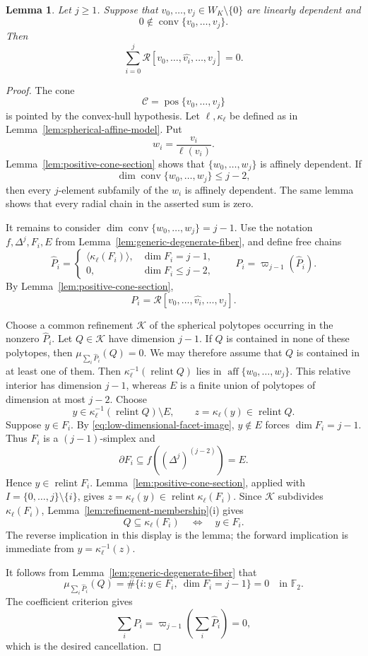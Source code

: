 \documentclass[reqno,12pt]{amsart}
\newtheorem{lemma}[theorem]{Lemma}
\theoremstyle{definition}
\DeclareMathOperator{\conv}{conv}
\DeclareMathOperator{\pos}{pos}
\DeclareMathOperator{\relint}{relint}
\newcommand{\F}{\mathbb F_2}
\begin{document}
\begin{lemma}
\label{lem:degenerate-radial-cancellation}
Let \(j\geq1\).  Suppose that
\(v_0,\ldots,v_j\in W_K\setminus\{0\}\) are linearly dependent and
\[
 0\notin\conv\{v_0,\ldots,v_j\}.
\]
Then
\[
 \sum_{i=0}^j
 \mathcal R[v_0,\ldots,\widehat{v_i},\ldots,v_j]=0.
\]
\end{lemma}

\begin{proof}
The cone
\[
 \mathcal C=\pos\{v_0,\ldots,v_j\}
\]
is pointed by the convex-hull hypothesis.  Let
\(\ell,\kappa_\ell\) be defined as in
Lemma~\ref{lem:spherical-affine-model}.  Put
\[
 w_i=\frac{v_i}{\ell(v_i)}.
\]
Lemma~\ref{lem:positive-cone-section} shows that
\(\{w_0,\ldots,w_j\}\) is affinely dependent.  If
\[
 \dim\conv\{w_0,\ldots,w_j\}\leq j-2,
\]
then every \(j\)-element subfamily of the \(w_i\) is affinely
dependent.  The same lemma shows that every radial chain in the
asserted sum is zero.

It remains to consider
\(\dim\conv\{w_0,\ldots,w_j\}=j-1\).  Use the notation
\(f,\Delta^j,F_i,E\) from
Lemma~\ref{lem:generic-degenerate-fiber}, and define free chains
\[
 \widehat P_i=
 \begin{cases}
  \langle\kappa_\ell(F_i)\rangle,&\dim F_i=j-1,\\
  0,&\dim F_i\leq j-2,
 \end{cases}
 \qquad
 P_i=\varpi_{j-1}(\widehat P_i).
\]
By Lemma~\ref{lem:positive-cone-section},
\[
 P_i=\mathcal R[v_0,\ldots,\widehat{v_i},\ldots,v_j].
\]

Choose a common refinement \(\mathcal K\) of the spherical polytopes
occurring in the nonzero \(\widehat P_i\).  Let
\(Q\in\mathcal K\) have dimension \(j-1\).  If \(Q\) is contained in
none of these polytopes, then
\(\mu_{\sum_i\widehat P_i}(Q)=0\).  We may therefore assume that
\(Q\) is contained in at least one of them.  Then
\(\kappa_\ell^{-1}(\relint Q)\) lies in
\(\operatorname{aff}\{w_0,\ldots,w_j\}\).  This relative interior has
dimension \(j-1\), whereas \(E\) is a finite union of polytopes of
dimension at most \(j-2\).  Choose
\[
 y\in\kappa_\ell^{-1}(\relint Q)\setminus E,
 \qquad
 z=\kappa_\ell(y)\in\relint Q.
\]
Suppose \(y\in F_i\).  By
\eqref{eq:low-dimensional-facet-image}, \(y\notin E\) forces
\(\dim F_i=j-1\).  Thus \(F_i\) is a \((j-1)\)-simplex and
\[
 \partial F_i\subseteq f((\Delta^j)^{(j-2)})=E.
\]
Hence \(y\in\relint F_i\).
Lemma~\ref{lem:positive-cone-section}, applied with
\(I=\{0,\ldots,j\}\setminus\{i\}\), gives
\(z=\kappa_\ell(y)\in\relint\kappa_\ell(F_i)\).
Since \(\mathcal K\) subdivides
\(\kappa_\ell(F_i)\), Lemma~\ref{lem:refinement-membership}(i) gives
\[
 Q\subseteq\kappa_\ell(F_i)
 \quad\Longleftrightarrow\quad
 y\in F_i.
\]
The reverse implication in this display is the lemma; the forward
implication is immediate from \(y=\kappa_\ell^{-1}(z)\).

It follows from Lemma~\ref{lem:generic-degenerate-fiber} that
\[
 \mu_{\sum_i\widehat P_i}(Q)
 =
 \#\{i:y\in F_i,\ \dim F_i=j-1\}=0
 \quad\text{in }\F.
\]
The coefficient criterion gives
\[
 \sum_iP_i=\varpi_{j-1}\!\left(\sum_i\widehat P_i\right)=0,
\]
which is the desired cancellation.
\end{proof}
\end{document}
